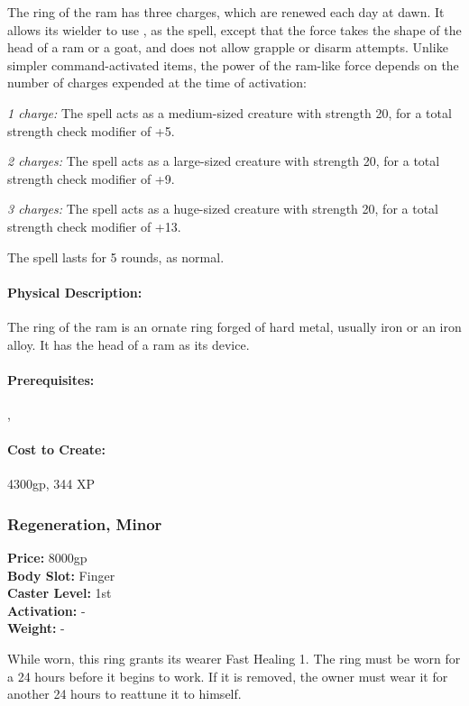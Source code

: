 The ring of the ram has three charges, which are renewed each day at dawn. It allows its wielder to use , as the spell, except that the force takes the shape of the head of a ram or a goat, and does not allow grapple or disarm attempts. Unlike simpler command-activated items, the power of the ram-like force depends on the number of charges expended at the time of activation:
\begin{list}{}{\leftmargin=1em}
\item \emph{1 charge:} The spell acts as a medium-sized creature with strength 20, for a total strength check modifier of +5.
\item \emph{2 charges:} The spell acts as a large-sized creature with strength 20, for a total strength check modifier of +9.
\item \emph{3 charges:} The spell acts as a huge-sized creature with strength 20, for a total strength check modifier of +13.
\end{list}
The spell lasts for 5 rounds, as normal.

\paragraph{Physical Description:} The ring of the ram is an ornate ring forged of hard metal, usually iron or an iron alloy. It has the head of a ram as its device.

\paragraph{Prerequisites:} , 

\paragraph{Cost to Create:} 4300gp, 344 XP
\subsubsection{Regeneration, Minor}
\label{Item:RegenerationMinor}
   \textbf{Price:} 8000gp
\\ \textbf{Body Slot:} Finger
\\ \textbf{Caster Level:} 1st
\\ \textbf{Activation:} -
\\ \textbf{Weight:} -

While worn, this ring grants its wearer Fast Healing 1.
The ring must be worn for a 24 hours before it begins to work. If it is removed, the owner must wear it for another 24 hours to reattune it to himself.

